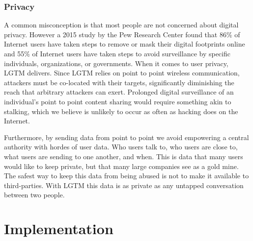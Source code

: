 \documentclass[12pt]{report}
\begin{document}



\subsection{Privacy} %
A common misconception is that most people are not concerned about digital privacy. However a 2015 study by the Pew Research Center \cite{AmericanPrivacyOnlinePew2015} found that 86\% of Internet users have taken steps to remove or mask their digital footprints online and 55\% of Internet users have taken steps to avoid surveillance by specific individuals, organizations, or governments. When it comes to user privacy, LGTM delivers. Since LGTM relies on point to point wireless communication, attackers must be co-located with their targets, significantly diminishing the reach that arbitrary attackers can exert. Prolonged digital surveillance of an individual's point to point content sharing would require something akin to stalking, which we believe is unlikely to occur as often as hacking does on the Internet. \par

Furthermore, by sending data from point to point we avoid empowering a central authority with hordes of user data. Who users talk to, who users are close to, what users are sending to one another, and when. This is data that many users would like to keep private, but that many large companies see as a gold mine. The safest way to keep this data from being abused is not to make it available to third-parties. With LGTM this data is as private as any untapped conversation between two people. \par


\chapter{Implementation}
\end{document}
